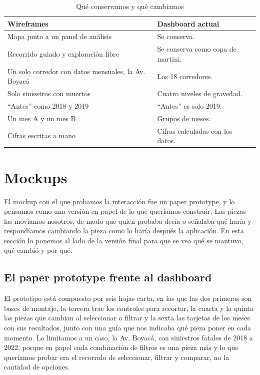 \documentclass[10pt,a4paper]{article}
\begin{document}
\begin{table}[!htbp]\centering\small
\begin{tabularx}{\linewidth}{LL}
\toprule
\textbf{Wireframes} & \textbf{Dashboard actual}\\
\midrule
Mapa junto a un panel de análisis & Se conserva.\\
Recorrido guiado y exploración libre & Se conserva como copa de martini.\\
Un solo corredor con datos mensuales, la Av. Boyacá & Los 18 corredores.\\
Solo siniestros con muertos & Cuatro niveles de gravedad.\\
``Antes'' como 2018 y 2019 & ``Antes'' es solo 2019.\\
Un mes A y un mes B & Grupos de meses.\\
Cifras escritas a mano & Cifras calculadas con los datos.\\
\bottomrule
\end{tabularx}
\caption{Qué conservamos y qué cambiamos}
\end{table}


\section{Mockups}

El mockup con el que probamos la interacción fue un paper prototype, y lo pensamos como una versión en papel de lo que queríamos construir. Las piezas las movíamos nosotros, de modo que quien probaba decía o señalaba qué haría y respondíamos cambiando la pieza como lo haría después la aplicación. En esta sección lo ponemos al lado de la versión final para que se vea qué se mantuvo, qué cambió y por qué.

\subsection{El paper prototype frente al dashboard}

El prototipo está compuesto por seis hojas carta, en las que las dos primeras son bases de montaje, la tercera trae los controles para recortar, la cuarta y la quinta las piezas que cambian al seleccionar o filtrar y la sexta las tarjetas de los meses con sus resultados, junto con una guía que nos indicaba qué pieza poner en cada momento. Lo limitamos a un caso, la Av. Boyacá, con siniestros fatales de 2018 a 2022, porque en papel cada combinación de filtros es una pieza más y lo que queríamos probar era el recorrido de seleccionar, filtrar y comparar, no la cantidad de opciones.
\end{document}
